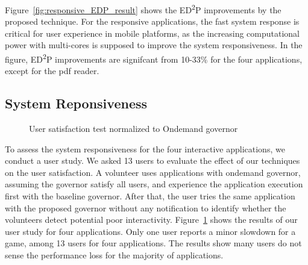 Figure~\ref{fig:responsive_EDP_result} shows the ED\textsuperscript{2}P improvements by the proposed technique.
For the responsive applications, the fast system response is critical for user experience in mobile platforms,
as the increasing computational power with multi-cores is supposed to improve the system responsiveness.
In the figure, ED\textsuperscript{2}P improvements are signifcant from 10-33\% for the four applications,
except for the pdf reader.

\subsection{System Reponsiveness}

\begin{figure}[bt]
\begin{center}
\end{center}
\caption{User satisfaction test normalized to Ondemand governor}
\label{fig:interactive_UX_result}
\end{figure}

To assess the system responsiveness for the four interactive applications, we conduct a user study.
We asked 13 users to evaluate the effect of our techniques on the user satisfaction. 
A volunteer uses applications with ondemand governor, assuming the governor satisfy all users, and experience the application execution first 
with the baseline governor. 
After that, the user tries the same application with the proposed governor without any notification 
to identify whether the volunteers detect potential poor interactivity.  
Figure~\ref{fig:interactive_UX_result} shows the results of our user study for four applications. 
Only one user reports a minor slowdown for a game, among 13 users for four applications.
The results show many users do not sense the performance loss for the majority of applications.

\begin{comment}
\begin{figure}[bt]
\begin{center}
\epsfig{figure=graphs/latency_different_headroom_size.eps, width=7cm}
\vspace{-0.2in}
\end{center}
\caption{Latency between user input and frequency raising}
\label{fig:latency_different_headroom_size}
\end{figure}

The second method for system responsiveness is to check whether CPU utilization reaches 99-100\%, meaning the current
frequency setting can be too low for the current CPU load. Such a low frequency setting can degrade the application 
performance, as the application cannot receive enough CPU resource.

\end{comment}
